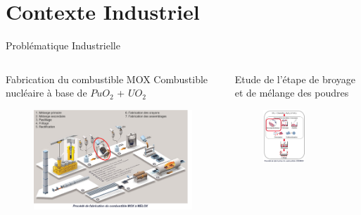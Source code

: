 \documentclass[aspectratio=169]{beamer} %
\begin{document}
\section{Contexte Industriel}
\begin{frame}{Problématique Industrielle}
    \begin{columns}
        \begin{column}{0.5\textwidth}
            \begin{block}{Fabrication du combustible MOX}
                Combustible nucléaire à base de $PuO_2$ + $UO_2$
                \begin{figure}
                    \includegraphics[width=\textwidth]{image/cycle_combustible.png}
                \end{figure}
            \end{block}
        \end{column}
        \begin{column}{0.5\textwidth}
            Etude de l'étape de broyage et de mélange des poudres
            \begin{figure}
                \includegraphics[width=0.6\textwidth]{image/broyage1.png}
            \end{figure}
        \end{column}
    \end{columns}
\end{frame}
\end{document}
